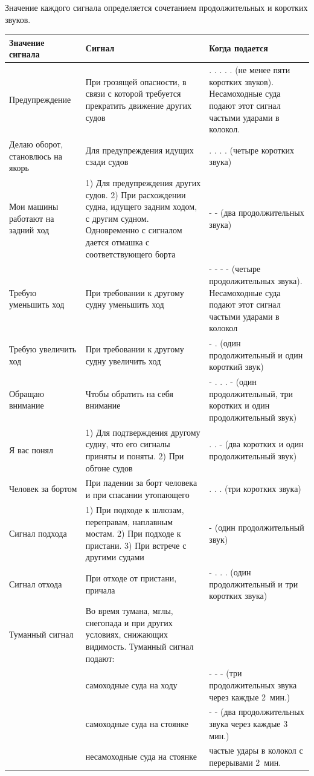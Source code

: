 \documentclass[a4paper, 12pt, twoside, final]{scrbook}
\begin{document}
Значение каждого сигнала определяется сочетанием продолжительных и коротких звуков.

\begin{longtable}{p{}p{}p{}}
	\toprule
	Значение сигнала & Сигнал & Когда подается \\
	\midrule
	Предупреждение & При   грозящей опасности, в связи с которой требуется прекратить движение других судов & . . . . . (не менее пяти коротких звуков). Несамоходные суда подают этот сигнал частыми ударами в колокол. \\
	\midrule
	Делаю оборот, становлюсь на якорь & Для предупреждения идущих сзади судов & . . . . (четыре коротких звука) \\
	\midrule
	Мои машины работают на задний ход & 1) Для предупреждения других судов.
2) При расхождении судна, идущего задним ходом, с другим судном. Одновременно с сигналом дается отмашка с соответствующего борта & - - (два продолжительных звука) \\
	\midrule
	Требую уменьшить ход & При требовании  к   другому судну  уменьшить ход & - - - - (четыре продолжительных звука). Несамоходные суда подают этот сигнал частыми ударами в колокол\\
	\midrule
	Требую увеличить ход & При   требовании к другому судну увеличить ход & - . (один продолжительный и один короткий звук) \\
	\midrule
	Обращаю внимание & Чтобы обратить на себя внимание & - . . . - (один продолжительный, три коротких и один продолжительный звук) \\
	\midrule
	Я вас понял & 1) Для подтверждения другому судну, что его сигналы приняты и поняты. 2) При обгоне судов & . . - (два   коротких  и один продолжительный  звук) \\
	\midrule
	Человек за бортом & При падении за борт человека и при спасании  утопающего & . . . (три коротких звука) \\
	\midrule
	Сигнал подхода & 1) При подходе к шлюзам, переправам, наплавным мостам. 2) При   подходе   к пристани. 3) При встрече с другими судами & - (один продолжительный звук) \\
	\midrule
	Сигнал отхода & При отходе от пристани, причала & - . . . (один продолжительный и три коротких звука) \\
	\midrule
	Туманный сигнал & Во время тумана, мглы, снегопада и при других условиях, снижающих видимость. Туманный сигнал подают: & \\
	\cmidrule{2-3}
	& самоходные  суда на ходу & - - - (три продолжительных звука через каждые 2~мин.) \\
	\cmidrule{2-3}
	& самоходные суда на стоянке & -   -   (два  продолжительных   звука  через каждые 3 мин.) \\
	\cmidrule{2-3}
	& несамоходные суда на стоянке & частые удары в колокол  с перерывами  2\--3~мин. \\
	\bottomrule
\end{longtable}
\end{document}

